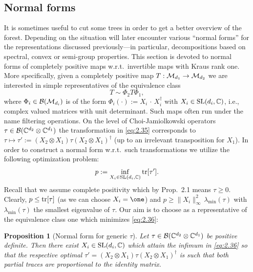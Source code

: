 \documentclass[11pt,a4paper]{article}
\numberwithin{equation}{section}
\theoremstyle{plain}
\newtheorem{proposition}{Proposition}[section]
\theoremstyle{definition}
\begin{document}
\subsection{Normal forms}

It is sometimes useful to cut some trees in order to get a better overview of the
forest. Depending on the situation will later encounter various ``normal forms'' for
the representations discussed previously---in particular, decompositions based
on spectral, convex or semi-group properties. This section is devoted to normal
forms of completely positive maps w.r.t.\ invertible maps with Kraus rank one.
More specifically, given a completely positive map $T:\mathcal{M}_{d_1} \to \mathcal{M}_{d_2}$ we
are interested in simple representatives of the equivalence class
\begin{equation}\label{eq:2.35}
    T \sim \Phi_2T\Phi_1,
\end{equation}
where $\Phi_i \in \mathcal{B}(\mathcal{M}_{d_i})$ is of the form $\Phi_i(\cdot):=X_i\,\cdot\,X_i^\dagger$
with $X_i\in \mathrm{SL}(d_i,\mathbb{C})$, i.e., complex valued matrices with unit
determinant. Such maps often run under the name filtering operations. On the level
of Choi-Jamiolkowski operators $\tau\in \mathcal{B}(\mathbb{C}^{d_2}\otimes \mathbb{C}^{d_1})$ the
transformation in \eqref{eq:2.35} corresponds to
$\tau\mapsto \tau' := (X_2\otimes X_1)\tau (X_2\otimes X_1)^\dagger$
(up to an irrelevant transposition for $X_1$). In order to construct a normal form
w.r.t.\ such transformations we utilize the following optimization problem:
\begin{equation}\label{eq:2.36}
    p := \inf_{X_i\in \mathrm{SL}(d_i,\mathbb{C})} \operatorname{tr}[\tau'].
\end{equation}
Recall that we assume complete positivity which by Prop.~2.1 means $\tau\ge 0$.
Clearly, $p\le \operatorname{tr}[\tau]$ (as we can choose $X_i=\one$) and
$p \ge \|X_i\|_\infty^2\,\lambda_{\min}(\tau)$ with $\lambda_{\min}(\tau)$ the
smallest eigenvalue of $\tau$. Our aim is to choose as a representative of the
equivalence class one which minimizes \eqref{eq:2.36}:

\begin{proposition}[Normal form for generic $\tau$]
    Let $\tau \in \mathcal{B}(\mathbb{C}^{d_2}\otimes \mathbb{C}^{d_1})$ be positive definite. Then there exist
    $X_i\in \mathrm{SL}(d_i,\mathbb{C})$ which attain the infimum in \eqref{eq:2.36} so that the
    respective optimal $\tau'=(X_2\otimes X_1)\tau (X_2\otimes X_1)^\dagger$ is such that
    both partial traces are proportional to the identity matrix.
\end{proposition}
\end{document}
